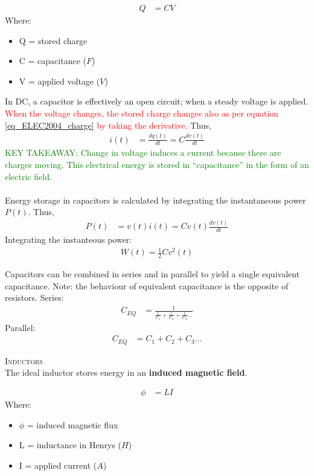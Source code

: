 \begin{align} \label{eq_ELEC2004_charge}
  Q &= CV
\end{align}
Where:
\begin{itemize}
  \item Q = stored charge
  \item C = capacitance ($F$)
  \item V = applied voltage ($V$)
\end{itemize}

In DC, a capacitor is effectively an open circuit; when a steady voltage is applied. \textcolor{red}{When the voltage changes, the stored charge changes also as per equation \eqref{eq_ELEC2004_charge} by taking the derivative.} Thus,
\begin{align}
  i(t) &= \frac{dq(t)}{dt} = C \frac{dv(t)}{dt}
\end{align}
\textcolor{green}{KEY TAKEAWAY: Change in voltage induces a current because there are charges moving. This electrical energy is stored in ``capacitance'' in the form of an electric field.}\\
\\
Energy storage in capacitors is calculated by integrating the instantaneous power $P(t)$. Thus,
\begin{align}
  P(t) &= v(t)i(t) = Cv(t)\frac{dv(t)}{dt}
\end{align}
Integrating the instanteous power:
\begin{align}
  W(t) = \frac{1}{2}Cv^2(t)
\end{align}

Capacitors can be combined in series and in parallel to yield a single equivalent capacitance. Note: the behaviour of equivalent capacitance is the opposite of resistors. Series:
\begin{align}
  C_{EQ} &= \frac{1}{\frac{1}{C_1} + \frac{1}{C_2} + \frac{1}{C_3} ...}
\end{align}
Parallel:
\begin{align}
  C_{EQ} &= C_1 + C_2 + C_3 ...
\end{align}

\textsc{\large Inductors}\\
The ideal inductor stores energy in an \textbf{induced magnetic field}.

\begin{align}
  \phi &= LI
\end{align}
Where:
\begin{itemize}
  \item $\phi$ = induced magnetic flux
  \item L = inductance in Henrys ($H$)
  \item I = applied current ($A$)
\end{itemize}


